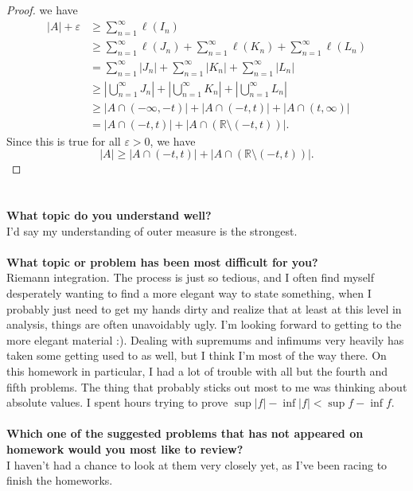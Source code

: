 \documentclass[12pt]{article}
\theoremstyle{definition}
\begin{document}
\begin{proof}
	we have \begin{align*}
		|A| + \varepsilon & \geq \sum_{n=1}^\infty \ell(I_n)                                                                                                 \\
		                  & \geq \sum_{n=1}^\infty \ell(J_n) + \sum_{n=1}^\infty \ell(K_n) + \sum_{n=1}^\infty \ell(L_n)                                     \\
		                  & = \sum_{n=1}^\infty |J_n| + \sum_{n=1}^\infty |K_n| + \sum_{n=1}^\infty |L_n|                                                    \\
		                  & \geq \left| \bigcup_{n=1}^\infty J_n \right| + \left| \bigcup_{n=1}^\infty K_n \right| + \left| \bigcup_{n=1}^\infty L_n \right| \\
		                  & \geq |A \cap (-\infty, -t)| + |A \cap (-t, t)| + |A \cap (t, \infty)|                                                            \\
		                  & = |A \cap (-t, t)| + |A \cap (\mathbb{R} \setminus (-t, t))|.
	\end{align*}
	Since this is true for all $\varepsilon > 0$, we have \begin{equation*}
		|A| \geq |A \cap (-t, t)| + |A \cap (\mathbb{R} \setminus (-t, t))|.
	\end{equation*}
\end{proof}

\section*{}

\textbf{What topic do you understand well?}\\
I'd say my understanding of outer measure is the strongest.
\\\\
\textbf{What topic or problem has been most difficult for you?}\\
Riemann integration.
The process is just so tedious, and I often find myself desperately wanting to find a more elegant way to state something, when I probably just need to get my hands dirty and realize that at least at this level in analysis, things are often unavoidably ugly.
I’m looking forward to getting to the more elegant material :).
Dealing with supremums and infimums very heavily has taken some getting used to as well, but I think I’m most of the way there.
On this homework in particular, I had a lot of trouble with all but the fourth and fifth problems.
The thing that probably sticks out most to me was thinking about absolute values.
I spent hours trying to prove $\sup |f| - \inf |f| < \sup f - \inf f$.
\\\\
\textbf{Which one of the suggested problems that has not appeared on homework would you most like to review?}\\
I haven't had a chance to look at them very closely yet, as I've been racing to finish the homeworks.
\\\\
\end{document}

